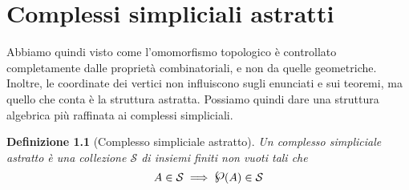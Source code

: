 \documentclass[a4paper]{report}
\newtheorem{definition}{Definizione}
\newcommand{\powerset}{\raisebox{.15\baselineskip}{\Large\ensuremath{\wp}}}
\begin{document}
\chapter{Complessi simpliciali astratti}
Abbiamo quindi visto come l'omomorfismo topologico è controllato completamente dalle proprietà combinatoriali, e non da quelle geometriche.\\
Inoltre, le coordinate dei vertici non influiscono sugli enunciati e sui teoremi, ma quello che conta è la struttura astratta. Possiamo quindi dare una struttura algebrica più raffinata ai complessi simpliciali.
\begin{definition}[Complesso simpliciale astratto]
    Un complesso simpliciale astratto è una collezione $\mathcal{S}$ di insiemi finiti non vuoti tali che
    \[
        A\in\mathcal{S}\implies\powerset(A)\in\mathcal{S}
    \]
\end{definition}
\end{document}
